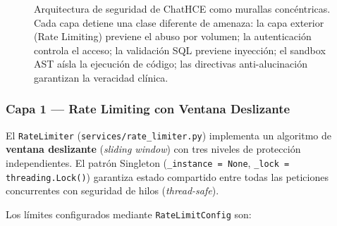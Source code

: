\begin{figure}[t]
\caption{Arquitectura de seguridad de ChatHCE como murallas concéntricas. Cada capa detiene una clase diferente de amenaza: la capa exterior (Rate Limiting) previene el abuso por volumen; la autenticación controla el acceso; la validación SQL previene inyección; el sandbox AST aísla la ejecución de código; las directivas anti-alucinación garantizan la veracidad clínica.}
\label{fig:security_layers}
\end{figure}

\subsubsection{Capa 1 — Rate Limiting con Ventana Deslizante}
\label{sec:rate_limiting}

El \texttt{RateLimiter} (\texttt{services/rate\_limiter.py}) implementa un algoritmo de \textbf{ventana deslizante} (\textit{sliding window}) \citep{Fielding2000} con tres niveles de protección independientes. El patrón Singleton (\texttt{\_instance = None}, \texttt{\_lock = threading.Lock()}) garantiza estado compartido entre todas las peticiones concurrentes con seguridad de hilos (\textit{thread-safe}).

Los límites configurados mediante \texttt{RateLimitConfig} son:

